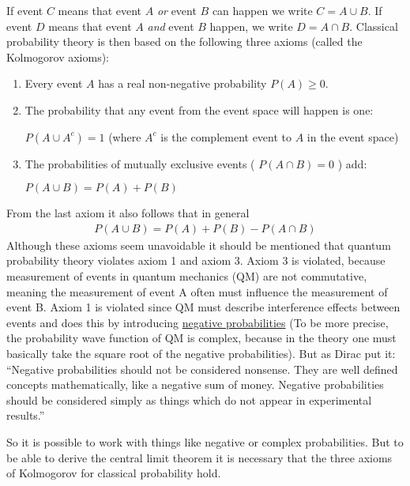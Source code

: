 If event $C$ means that event $A$ \emph{or} event $B$ can happen
we write $C = A \cup B$. If event $D$ means that event $A$
\emph{and} event $B$ happen, we write $D = A \cap B$. Classical
probability theory is then based on the following three axioms (called
the Kolmogorov axioms):

\begin{enumerate}
\item
  Every event $A$ has a real non-negative probability $P(A) \ge 0$.
\item
  The probability that any event from the event space will happen is
  one: 
  
  $P(A \cup A^c) = 1$ (where $A^c$ is the complement event to
  $A$ in the event space)
\item
  The probabilities of mutually exclusive events ( $P(A \cap B) = 0$ )
  add: 
  
  $P(A \cup B) = P(A) + P(B)$
\end{enumerate}

From the last axiom it also follows that in general
\begin{align}
P(A \cup B) = P(A) + P(B) - P(A \cap B)
\end{align}
Although these axioms seem unavoidable it should be mentioned that
quantum probability theory violates axiom 1 and axiom 3. Axiom 3 is
violated, because measurement of events in quantum mechanics (QM) are
not commutative, meaning the measurement of event A often must influence
the measurement of event B. Axiom 1 is violated since QM must describe
interference effects between events and does this by introducing
\href{https://en.wikipedia.org/wiki/Negative_probability}{negative
probabilities} (To be more precise, the probability wave function of QM
is complex, because in the theory one must basically take the square
root of the negative probabilities). But as Dirac put it: ``Negative
probabilities should not be considered nonsense. They are well defined
concepts mathematically, like a negative sum of money. Negative
probabilities should be considered simply as things which do not appear
in experimental results.''

So it is possible to work with things like negative or complex
probabilities. But to be able to derive the central limit theorem it is
necessary that the three axioms of Kolmogorov for classical probability
hold.


